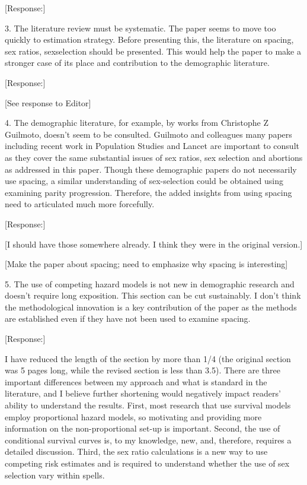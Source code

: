 \documentclass[letterpaper,12pt]{article}
\begin{document}
[Response:]

3. The literature review must be systematic. The paper seems to move too
quickly to estimation strategy. Before presenting this, the literature
on spacing, sex ratios, sexselection should be presented. This would
help the paper to make a stronger case of its place and contribution to
the demographic literature.

[Response:]

[See response to Editor]


4. The demographic literature, for example, by works from Christophe Z
Guilmoto, doesn’t seem to be consulted. Guilmoto and colleagues many
papers including recent work in Population Studies and Lancet are
important to consult as they cover the same substantial issues of sex
ratios, sex selection and abortions as addressed in this paper. Though
these demographic papers do not necessarily use spacing, a similar
understanding of sex-selection could be obtained using examining parity
progression. Therefore, the added insights from using spacing need to
articulated much more forcefully.

[Response:]

[I should have those somewhere already. I think they were in the original version.]

[Make the paper about spacing; need to emphasize why spacing is interesting]

5. The use of competing hazard models is not new in demographic research
and doesn’t require long exposition. This section can be cut
sustainably. I don’t think the methodological innovation is a key
contribution of the paper as the methods are established even if they
have not been used to examine spacing.

[Response:]

I have reduced the length of the section by more than 1/4 (the original section was 5
pages long, while the revised section is less than 3.5).
There are three important differences between my approach and what is standard
in the literature, and I believe further shortening would negatively impact readers'
ability to understand the results.
First, most research that use survival models employ proportional hazard models, so 
motivating and providing more information on the non-proportional set-up is important.
Second, the use of conditional survival curves is, to my knowledge, new, and, therefore,
requires a detailed discussion.
Third, the sex ratio calculations is a new way to use competing risk estimates and is 
required to understand whether the use of sex selection vary within spells.
\end{document}
